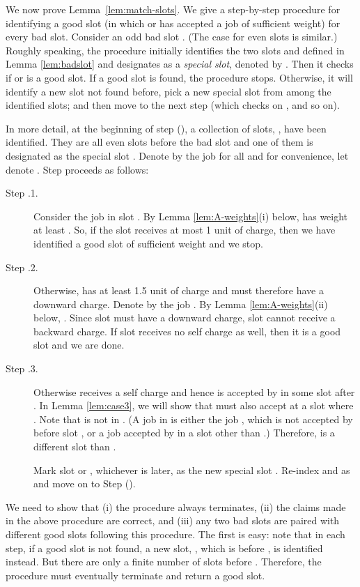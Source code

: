 \documentclass[11pt]{article}
\begin{document}
We now prove Lemma~\ref{lem:match-slots}.
We give a step-by-step procedure for identifying a good slot 
(in which  or  has accepted a job of sufficient weight) 
for every bad slot.
Consider an odd bad slot . (The case for even slots
is similar.)  
Roughly speaking, the procedure initially identifies the two slots
 and  defined in Lemma \ref{lem:badslot}
and designates  as a {\em special slot}, denoted by .
Then it checks if  or  is a good slot.
If a good slot is found, the procedure stops.
Otherwise, it will identify a new slot not found before,
pick a new special slot  from among the
identified slots;
and then move to the next step (which checks on , 
and so on).

In more detail, at the beginning of step  (),
a collection of  slots, ,
have been identified.
They are all even slots before the bad slot  and
one of them is designated as the special slot .
Denote by  the job  for all
 and for convenience, let
 denote .
Step  proceeds as follows:
\begin{description}
\item[{\rm Step .1.}] 
Consider the job  in slot .
By Lemma \ref{lem:A-weights}(i) below,
 has weight at least .
So, if the slot  receives at most 1 unit of charge,
then we have identified a good slot of sufficient weight
and we stop.

\item[{\rm Step .2.}] 
Otherwise,  has at least 1.5 unit of charge
and must therefore have a downward charge.
Denote by  the job .
By Lemma \ref{lem:A-weights}(ii) below, .
Since slot  must have a downward charge,
slot  cannot receive a backward charge.
If slot  receives no self charge as well, 
then it is a good slot and we are done.  

\item[{\rm Step .3.}]
Otherwise  receives a self charge and hence  is
accepted by  in some slot  after .
In Lemma \ref{lem:case3}, we will show that  must also
accept  at a slot  where .
Note that  is not in .
(A job in   is either the
job , which is not accepted by  before slot ,
or a job accepted by  in a slot other than
.)
Therefore,  is a different slot than 
.

Mark slot  or , whichever is later,
as the new special slot .
Re-index  and 
as  and
move on to Step ().
\end{description}

We need to show that
(i) the procedure always terminates,
(ii) the claims made in the above procedure are correct, and
(iii) any two bad slots are paired with different good slots
following this procedure.  
The first is easy: note that in each step, 
if a good slot is not found, a new slot, ,
which is before , is identified instead.
But there are only a finite number of slots before . 
Therefore, the procedure must eventually terminate and
return a good slot.
\end{document}
